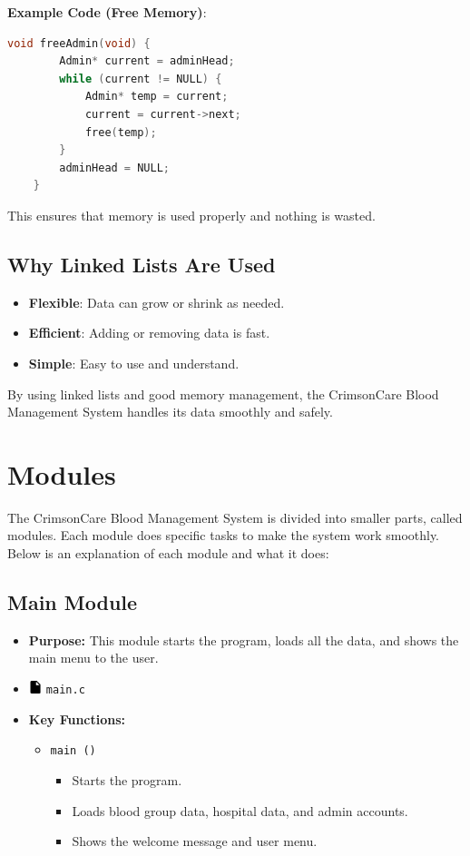 \documentclass[12pt,a4paper]{report}
\begin{document}
\normalsize \textbf{Example Code (Free Memory)}:
\begin{lstlisting}[language=C, caption=Freeing the Admin List]
    void freeAdmin(void) {
        Admin* current = adminHead;
        while (current != NULL) {
            Admin* temp = current;
            current = current->next;
            free(temp);
        }
        adminHead = NULL;
    }
\end{lstlisting}

This ensures that memory is used properly and nothing is wasted.

\subsection*{Why Linked Lists Are Used}
\begin{itemize}
    \item \textbf{Flexible}: Data can grow or shrink as needed.
    \item \textbf{Efficient}: Adding or removing data is fast.
    \item \textbf{Simple}: Easy to use and understand.
\end{itemize}

By using linked lists and good memory management, the CrimsonCare Blood Management System handles its data smoothly and safely.

\section{Modules}
The CrimsonCare Blood Management System is divided into smaller parts, called modules.
Each module does specific tasks to make the system work smoothly. Below is an explanation of each module and what it does:

\subsection{Main Module}
\begin{itemize}
    \item \normalsize \textbf{Purpose:} This module starts the program, loads all the data, and shows the main menu to the user.
    \item \normalsize \includegraphics[width=0.03\textwidth]{../resources/assets/images/file_icon.png} \texttt{main.c}
    \item \normalsize \textbf{Key Functions:}
    \begin{itemize}
        \item \normalsize \texttt{main ()}
        \begin{itemize}
            \item Starts the program.
            \item Loads blood group data, hospital data, and admin accounts.
            \item Shows the welcome message and user menu.
        \end{itemize}
    \end{itemize}
\end{itemize}
\end{document}
